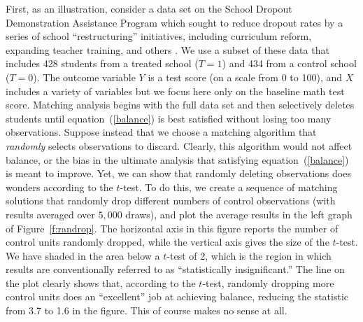 \documentclass[11pt,titlepage]{article}
\begin{document}
First, as an illustration, consider a data set on the School Dropout
Demonstration Assistance Program which sought to reduce dropout rates
by a series of school ``restructuring'' initiatives, including
curriculum reform, expanding teacher training, and others
\citep{AgoDyn04,Stuart04}.  We use a subset of these data that
includes 428 students from a treated school ($T=1$) and 434 from a
control school ($T=0$).  The outcome variable $Y$ is a test score (on
a scale from 0 to 100), and $X$ includes a variety of variables but we
focus here only on the baseline math test score.  Matching analysis
begins with the full data set and then selectively deletes students
until equation~(\ref{balance}) is best satisfied without losing too
many observations.  Suppose instead that we choose a matching
algorithm that \emph{randomly} selects observations to discard.
Clearly, this algorithm would not affect balance, or the bias in the
ultimate analysis that satisfying equation~(\ref{balance}) is meant to
improve.  Yet, we can show that randomly deleting observations does
wonders according to the $t$-test.  To do this, we create a sequence
of matching solutions that randomly drop different numbers of control
observations (with results averaged over $5,000$ draws), and plot the
average results in the left graph of Figure~\ref{f:randrop}.  The
horizontal axis in this figure reports the number of control units
randomly dropped, while the vertical axis gives the size of the
$t$-test.  We have shaded in the area below a $t$-test of 2, which is
the region in which results are conventionally referred to as
``statistically insignificant.''  The line on the plot clearly shows
that, according to the $t$-test, randomly dropping more control units
does an ``excellent'' job at achieving balance, reducing the statistic
from 3.7 to 1.6 in the figure.  This of course makes no sense at all.
\end{document}
